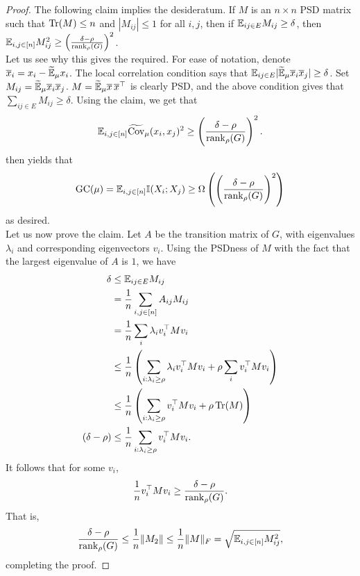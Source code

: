	\begin{proof}
		The following claim implies the desideratum. If $M$ is an $n \times n$ PSD matrix such that $\operatorname{Tr}(M) \le n$ and $|M_{ij}| \le 1$ for all $i,j$, then if $\mathbb{E}_{ij \in E} M_{ij} \ge \delta$, then $\mathbb{E}_{i,j \in [n]} M_{ij}^2 \ge \left(\frac{\delta-\rho}{\operatorname{rank}_\rho(G)}\right)^2$.\\
		Let us see why this gives the required. For ease of notation, denote $\overline{x}_i = x_i - \widetilde{\mathbb{E}}_\mu x_i$. The local correlation condition says that $\mathbb{E}_{ij \in E} |\widetilde{\mathbb{E}}_\mu \overline{x}_i \overline{x}_j| \ge \delta$.
		Set $M_{ij} = \widetilde{\mathbb{E}}_\mu \overline{x}_i \overline{x}_j$. $M = \widetilde{\mathbb{E}}_\mu \overline{x} \, \overline{x}^\top$ is clearly PSD, and the above condition gives that $\sum_{ij \in E} M_{ij} \ge \delta$. Using the claim, we get that
		\[ \mathbb{E}_{i,j \in [n]} \widetilde{\operatorname{Cov}}_\mu(x_i,x_j)^2 \ge \left( \frac{\delta-\rho}{\operatorname{rank}_\rho(G)} \right)^2. \] 
		 then yields that
		\[ \operatorname{GC}(\mu) = \mathbb{E}_{i,j \in [n]} \mathbb{I}(X_i;X_j) \ge \Omega\left( \left(\frac{\delta-\rho}{\operatorname{rank}_\rho(G)}\right)^2 \right) \]
		as desired.\\

		Let us now prove the claim. Let $A$ be the transition matrix of $G$, with eigenvalues $\lambda_i$ and corresponding eigenvectors $v_i$. Using the PSDness of $M$ with the fact that the largest eigenvalue of $A$ is $1$, we have
		\begin{align*}
			\delta &\le \mathbb{E}_{ij \in E} M_{ij} \\
				&= \frac{1}{n} \sum_{i,j \in [n]} A_{ij} M_{ij} \\
				&= \frac{1}{n} \sum_{i} \lambda_i v_i^\top M v_i \\
				&\le \frac{1}{n} \left(\sum_{i : \lambda_i \ge \rho} \lambda_i v_i^\top M v_i + \rho \sum_{i} v_i^\top M v_i \right) \\
				&\le \frac{1}{n} \left(\sum_{i : \lambda_i \ge \rho} v_i^\top M v_i + \rho \operatorname{Tr}(M) \right) \\
			(\delta-\rho) &\le \frac{1}{n} \sum_{i : \lambda_i \ge \rho} v_i^\top M v_i.
		\end{align*}
		It follows that for some $v_i$,
		\[ \frac{1}{n} v_i^\top M v_i \ge \frac{\delta-\rho}{\operatorname{rank}_\rho(G)}. \]
		That is,
		\[ \frac{\delta-\rho}{\operatorname{rank}_\rho(G)} \le \frac{1}{n} \|M_2\| \le \frac{1}{n} \|M\|_F = \sqrt{\mathbb{E}_{i,j \in [n]} M_{ij}^2}	, \]
		completing the proof.
	\end{proof}
